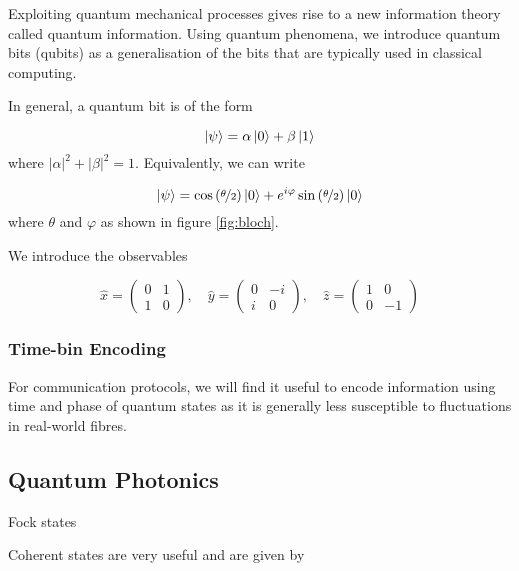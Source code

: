Exploiting quantum mechanical processes gives rise to a new information theory called {\textcolor{bristol-red} quantum information}. Using quantum phenomena, we introduce quantum bits (qubits) as a generalisation of the bits that are typically used in classical computing.

In general, a quantum bit is of the form 

\begin{equation}
	\ket{\psi} = \alpha\ket{0} + \beta\ket{1}
\end{equation}
where $|\alpha|^2 + |\beta|^2 = 1$. Equivalently, we can write

\begin{equation}
	\ket{\psi} = \cos\left(\nicefrac{\theta}{2}\right)\ket{0} + e^{i\varphi}\sin\left(\nicefrac{\theta}{2}\right)\ket{0}
\end{equation}
where $\theta$ and $\varphi$ as shown in figure \ref{fig:bloch}.

We introduce the observables 

\begin{equation}
	\hat{x} = \left(\begin{matrix}
		0 & 1 \\
		1 & 0
	\end{matrix}\right),
	\quad
	\hat{y} = \left(\begin{matrix}
		0 & -i \\
		i & 0
	\end{matrix}\right),
	\quad
	\hat{z} = \left(\begin{matrix}
		1 & 0 \\
		0 & -1
	\end{matrix}\right)
\end{equation}

\subsubsection{Time-bin Encoding}

For communication protocols, we will find it useful to encode information using time and phase of quantum states as it is generally less susceptible to fluctuations in real-world fibres.

\subsection{Quantum Photonics}

Fock states

Coherent states are very useful and are given by

